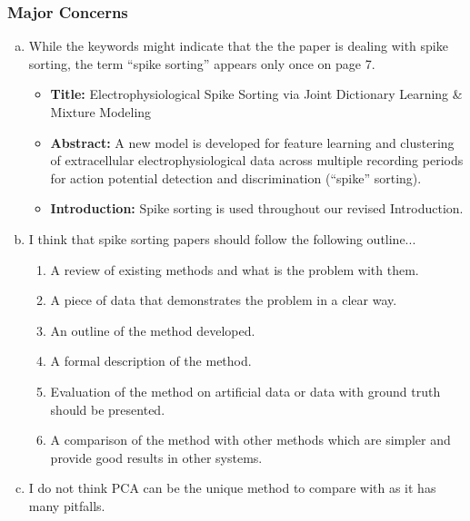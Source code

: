 \subsubsection{Major Concerns} %
\label{ssub:major_concerns}


\begin{enumerate}[a.]
	\item While the keywords might indicate that the the paper is dealing with spike sorting, the term “spike sorting” appears only once on page 7. 
	
	
	\begin{itemize}
		\item \textbf{Title:} Electrophysiological Spike Sorting via Joint Dictionary Learning \& Mixture Modeling
		\item \textbf{Abstract:} A new model is developed for feature learning and clustering of extracellular  electrophysiological data across multiple recording periods for action potential detection and discrimination (``spike'' sorting).
		\item \textbf{Introduction:} Spike sorting is used throughout our revised Introduction.
	\end{itemize}
	
	\item I think that spike sorting papers should follow the following outline...
	\begin{enumerate}
		\item A review of existing methods and what is the problem with them.
		\item A piece of data that demonstrates the problem in a clear way. 
		\item An outline of the method developed.
		\item A formal description of the method.
		\item Evaluation of the method on artificial data or data with ground truth should be presented.
		\item  A comparison of the method with other methods which are simpler and provide good results in other systems.
	\end{enumerate}
	
	
	\item I do not think PCA can be the unique method to compare with as it has many pitfalls. 
	
	
\end{enumerate}


